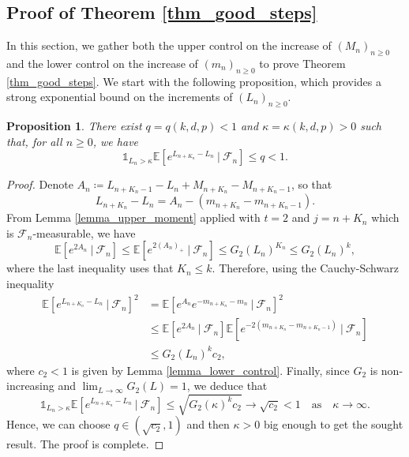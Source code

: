 \documentclass[a4paper, 11pt]{article}
\theoremstyle{plain}
\newtheorem{Proposition}[Theorem]{Proposition}
\theoremstyle{definition}
\newtheorem{Remark}[Theorem]{Remark}
\newcommand{\E}{\mathbb{E}}
\renewcommand{\P}{\mathbb{P}}
\numberwithin{equation}{section}
\begin{document}


\subsection{Proof of Theorem \ref{thm_good_steps}}

\label{subsection_proof_good_steps}



In this section, we gather both the upper control on the increase of $(M_n)_{n\geq 0}$ and the lower control on the increase of $(m_n)_{n\geq 0}$ to prove Theorem \ref{thm_good_steps}. We start with the following proposition, which provides a strong exponential bound on the increments of $(L_n)_{n\geq0}$.


\begin{Proposition}
    \label{prop_ln_exp_control}
    There exist $q=q(k, d, p)<1$ and $\kappa=\kappa(k, d, p)>0$ such that, for all $n\geq0$, we have
        \[\mathds 1_{L_n>\kappa}\E[e^{L_{n+K_n}-L_n}~\vert~\mathcal F_n]\leq q<1.\]
\end{Proposition}

\begin{proof}
    Denote $A_n\coloneqq L_{n+K_n-1}-L_n+M_{n+K_n}-M_{n+K_n-1}$, so that
        \[L_{n+K_n}-L_n=A_n-(m_{n+K_n}-m_{n+K_n-1}).\]
    From Lemma \ref{lemma_upper_moment} applied with $t=2$ and $j=n+K_n$ which is $\mathcal F_n$-measurable, we have
        \[\E[e^{2A_n}~\vert~\mathcal F_n]\leq\E[e^{2(A_n)_+}~\vert~\mathcal F_n]\leq G_2(L_n)^{K_n}\leq G_2(L_n)^k,\]
    where the last inequality uses that $K_n\leq k$. Therefore, using the Cauchy-Schwarz inequality
    \begin{equation*}
        \begin{split}
            \E[e^{L_{n+K_n}-L_n}~\vert~\mathcal F_n]^2&=\E[e^{A_n} e^{-m_{n+K_n}-m_n}~\vert~\mathcal F_n]^2\\
            &\leq\E[e^{2A_n}~\vert~\mathcal F_n]\E[e^{-2(m_{n+K_n}-m_{n+K_n-1})}~\vert~\mathcal F_n]\\
            &\leq G_2(L_n)^k c_2,
        \end{split}
    \end{equation*}
    where $c_2<1$ is given by Lemma \ref{lemma_lower_control}. Finally, since $G_2$ is non-increasing and $\lim_{L\to\infty}G_2(L)=1$, we deduce that
        \[\mathds 1_{L_n>\kappa}\E[e^{L_{n+K_n}-L_n}~\vert~\mathcal F_n]\leq\sqrt{G_2(\kappa)^kc_2}\to\sqrt{c_2}<1\quad\text{as}\quad \kappa\to\infty.\]
    Hence, we can choose $q\in(\sqrt{c_2}, 1)$ and then $\kappa>0$ big enough to get the sought result. The proof is complete.
\end{proof}
\end{document}
